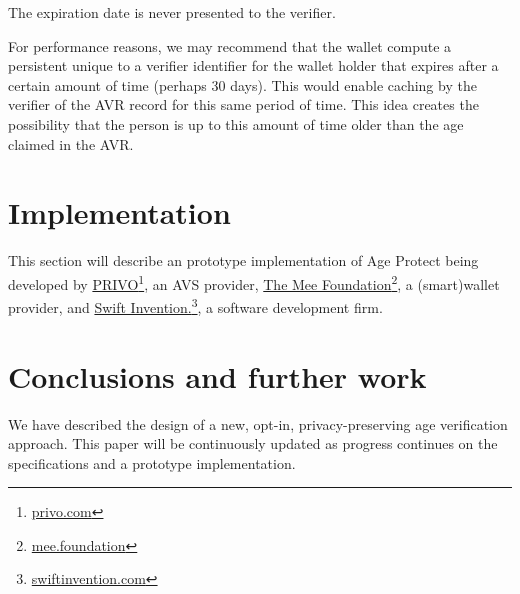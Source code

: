 \documentclass[11pt, oneside]{article}   	%
\newcommand{\hyperfootnote}[1][]{\def\ArgI{{#1}}\hyperfootnoteRelay}
\newcommand\hyperfootnoteRelay[2][]{\href{#1#2}{\ArgI}\footnote{\href{#1#2}{#2}}}
\begin{document}
The expiration date is never presented to the verifier.

For performance reasons, we may recommend that the wallet compute a persistent unique to a verifier identifier for the wallet holder that expires after a certain amount of time (perhaps 30 days). This would enable caching by the verifier of the AVR record for this same period of time. This idea creates the possibility that the person is up to this amount of time older than the age claimed in the AVR. 

\section{Implementation}

This section will describe an prototype implementation of Age Protect being developed by \hyperfootnote[PRIVO][https://]{privo.com}, an AVS provider, \hyperfootnote[The Mee Foundation][https://]{mee.foundation}, a (smart)wallet provider, and \hyperfootnote[Swift Invention.][https://]{swiftinvention.com}, a software development firm.

\section{Conclusions and further work}
We have described the design of a new, opt-in, privacy-preserving age verification approach. This paper will be continuously updated as progress continues on the specifications and a prototype implementation.



\end{document}
